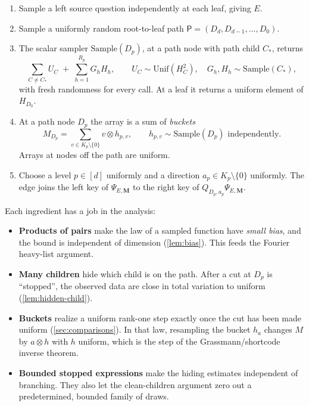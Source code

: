 \documentclass[11pt]{article}
\theoremstyle{definition}
\theoremstyle{remark}
\begin{document}
\begin{enumerate}
\item Sample a left source question independently at each leaf, giving $E$.
\item Sample a uniformly random root-to-leaf path
$\mathsf P=(D_d,D_{d-1},\ldots,D_0)$.
\item The scalar sampler $\mathrm{Sample}(D_p)$, at a path node with path child
$C_*$, returns
\[
 \sum_{C\neq C_*}U_C\;+\;\sum_{h=1}^{R_p}G_hH_h,
 \qquad U_C\sim\mathrm{Unif}(H_C^2),\quad G_h,H_h\sim\mathrm{Sample}(C_*),
\]
with fresh randomness for every call. At a leaf it returns a uniform element
of $H_{D_0}$.
\item At a path node $D_p$ the array is a sum of \emph{buckets}
\[
 M_{D_p}=\sum_{v\in K_p\setminus\{0\}}v\otimes h_{p,v},
 \qquad h_{p,v}\sim\mathrm{Sample}(D_p)\text{ independently.}
\]
Arrays at nodes off the path are uniform.
\item Choose a level $p\in[d]$ uniformly and a direction $a_p\in K_p\setminus\{0\}$
uniformly. The edge joins the left key of $\Psi_{E,\mathbf M}$ to the right
key of $Q_{D_p,a_p}\Psi_{E,\mathbf M}$.
\end{enumerate}

Each ingredient has a job in the analysis:
\begin{itemize}
\item \textbf{Products of pairs} make the law of a sampled function have
\emph{small bias}, and the bound is independent of dimension
(\cref{lem:bias}). This feeds the Fourier heavy-list argument.
\item \textbf{Many children} hide which child is on the path. After a cut at
$D_p$ is ``stopped'', the observed data are close in total variation to
uniform (\cref{lem:hidden-child}).
\item \textbf{Buckets} realize a uniform rank-one step exactly once the cut
has been made uniform (\cref{sec:comparisons}). In that law, resampling the
bucket $h_a$ changes $M$ by $a\otimes h$ with $h$ uniform, which is the step
of the Grassmann/shortcode inverse theorem.
\item \textbf{Bounded stopped expressions} make the hiding estimates independent
of branching. They also let the clean-children argument zero out a
predetermined, bounded family of draws.
\end{itemize}
\end{document}
